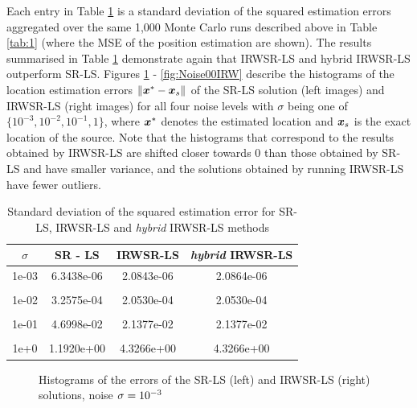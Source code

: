 Each entry in Table \ref{tab:2} is a standard deviation of the squared  estimation errors  aggregated over the  same 1,000 Monte Carlo runs described above in Table \ref{tab:1} (where the MSE of the position estimation are shown). The results summarised in Table \ref{tab:2} demonstrate again that IRWSR-LS and hybrid IRWSR-LS outperform SR-LS. Figures \ref{fig:Noise03IRW} - \ref{fig:Noise00IRW} describe the histograms of the location estimation errors $\|\mbox{\boldmath$x$}^* - \mbox{\boldmath$x$}_s\|$ of the SR-LS solution (left images) and IRWSR-LS (right images) for all four noise levels with $\sigma$ being one of $\{10^{-3}, 10^{-2}, 10^{-1}, 1\}$, where $\mbox{\boldmath$x$}^*$ denotes the estimated location and $\mbox{\boldmath$x$}_s$ is the exact location of the source. Note that the histograms that correspond to the results obtained by IRWSR-LS are shifted closer towards $0$ than those obtained by SR-LS and have smaller variance, and the solutions obtained by running IRWSR-LS have fewer outliers.


\begin{table}[h]
\centering
\caption{Standard deviation of the squared estimation error for SR-LS, IRWSR-LS and \textit{hybrid} IRWSR-LS methods}
\begin{tabular}{|c|c|c|c|} \hline
$\sigma$ & SR - LS & IRWSR-LS & \textit{hybrid} IRWSR-LS \\ \hline
1e-03&	6.3438e-06&	2.0843e-06 & 2.0864e-06\\ &&&\\
1e-02&	3.2575e-04&	2.0530e-04 & 2.0530e-04\\ &&&\\
1e-01&	4.6998e-02&	2.1377e-02 & 2.1377e-02\\ &&&\\
1e+0&	1.1920e+00&	4.3266e+00 & 4.3266e+00\\ %
\hline
\end{tabular}
\label{tab:2}
\end{table}



\begin{figure}%
\centering
\caption{Histograms of the errors of the SR-LS (left) and IRWSR-LS (right) solutions, noise $\protect\sigma = 10^{-3}$}
\label{fig:Noise03IRW}
\end{figure}

